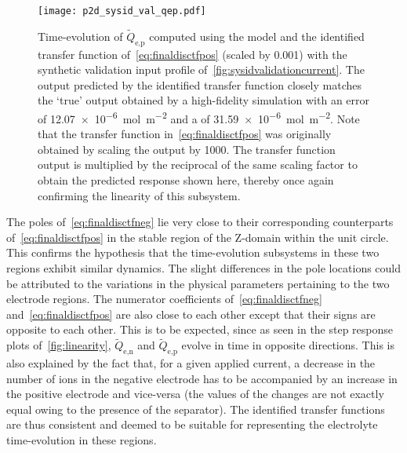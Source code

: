 \begin{figure}[!htbp]
    \centering
    \texttt{[image: p2d\_sysid\_val\_qep.pdf]}
    \caption[$\widetilde{Q}_{\text{e,p}}(t)$ outputs from  and
    identified transfer function for training profile]{%
        Time-evolution of $\widetilde{Q}_{\text{e,p}}$ computed using the
         model  and the identified transfer function
        of~\cref{eq:finaldisctfpos} (scaled by 0.001) with the synthetic
        validation input profile of~\cref{fig:sysidvalidationcurrent}. The output
        predicted by the identified transfer function closely matches the `true'
        output obtained by a high-fidelity  simulation with an
         error of \SI{12.07e-6}{\mole\per\meter\squared} and a
         of \SI{31.59e-6}{\mole\per\meter\squared}. Note that the
        transfer function in~\cref{eq:finaldisctfpos} was originally obtained by
        scaling the output by 1000. The transfer function output is
        multiplied by the reciprocal of the same scaling factor to obtain the
        predicted response shown here, thereby once again confirming the
        linearity of this subsystem.
    }%
    \label{fig:tfpredQepval}
\end{figure}

The  poles of~\cref{eq:finaldisctfneg}  lie  very close  to their  corresponding
counterparts of~\cref{eq:finaldisctfpos}  in the  stable region of  the Z-domain
\ie{}  within   the  unit  circle.   This  confirms  the  hypothesis   that  the
time-evolution subsystems  in these  two regions  exhibit similar  dynamics. The
slight differences in  the pole locations could be attributed  to the variations
in  the  physical  parameters  pertaining  to the  two  electrode  regions.  The
numerator coefficients  of~\cref{eq:finaldisctfneg} and~\cref{eq:finaldisctfpos}
are  also  close  to  each  other  except  that  their  signs  are  opposite  to
each   other.  This   is  to   be   expected,  since   as  seen   in  the   step
response   plots   of~\cref{fig:linearity},   $\widetilde{Q}_{\text{e,n}}$   and
$\widetilde{Q}_{\text{e,p}}$ evolve in time in opposite directions. This is also
explained by  the fact  that, for  a given  applied current,  a decrease  in the
number of ions in the negative electrode has to be accompanied by an increase in
the positive electrode and vice-versa (the values of the changes are not exactly
equal owing to the presence of the separator). The identified transfer functions
are thus consistent  and deemed to be suitable for  representing the electrolyte
time-evolution in these regions.

